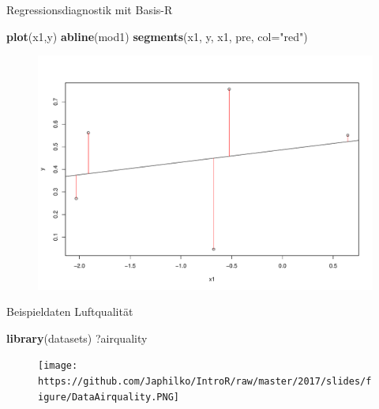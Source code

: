 \documentclass[ignorenonframetext,]{beamer}
\newenvironment{Shaded}{}{}
\newcommand{\KeywordTok}[1]{\textcolor[rgb]{0.00,0.44,0.13}{\textbf{{#1}}}}
\newcommand{\DataTypeTok}[1]{\textcolor[rgb]{0.56,0.13,0.00}{{#1}}}
\newcommand{\StringTok}[1]{\textcolor[rgb]{0.25,0.44,0.63}{{#1}}}
\newcommand{\NormalTok}[1]{{#1}}
\begin{document}
\begin{frame}[fragile]{Regressionsdiagnostik mit Basis-R}

\begin{Shaded}
\begin{Highlighting}[]
\KeywordTok{plot}\NormalTok{(x1,y)}
\KeywordTok{abline}\NormalTok{(mod1)}
\KeywordTok{segments}\NormalTok{(x1, y, x1, pre, }\DataTypeTok{col=}\StringTok{"red"}\NormalTok{)}
\end{Highlighting}
\end{Shaded}

\begin{figure}[htbp]
\centering
\includegraphics{RSocialScience2_files/figure-beamer/unnamed-chunk-75-1.pdf}
\caption{}
\end{figure}

\end{frame}

\begin{frame}[fragile]{Beispieldaten Luftqualität}

\begin{Shaded}
\begin{Highlighting}[]
\KeywordTok{library}\NormalTok{(datasets)}
\NormalTok{?airquality}
\end{Highlighting}
\end{Shaded}

\begin{figure}[htbp]
\centering
\texttt{[image: https://github.com/Japhilko/IntroR/raw/master/2017/slides/figure/DataAirquality.PNG]}
\caption{}
\end{figure}

\end{frame}
\end{document}
